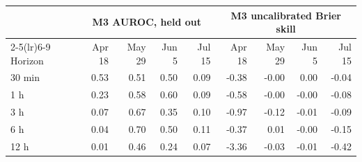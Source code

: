 \begin{tabular}{lrrrrrrrr}\toprule & \multicolumn{4}{c}{M3 AUROC, held out} & \multicolumn{4}{c}{M3 uncalibrated Brier skill}\\\cmidrule(lr){2-5}\cmidrule(lr){6-9} Horizon & Apr 18 & May 29 & Jun 5 & Jul 15 & Apr 18 & May 29 & Jun 5 & Jul 15\\\midrule
30 min & 0.53 & 0.51 & 0.50 & 0.09 & -0.38 & -0.00 & 0.00 & -0.04\\
1 h & 0.23 & 0.58 & 0.60 & 0.09 & -0.58 & -0.00 & -0.00 & -0.08\\
3 h & 0.07 & 0.67 & 0.35 & 0.10 & -0.97 & -0.12 & -0.01 & -0.09\\
6 h & 0.04 & 0.70 & 0.50 & 0.11 & -0.37 & 0.01 & -0.00 & -0.15\\
12 h & 0.01 & 0.46 & 0.24 & 0.07 & -3.36 & -0.03 & -0.01 & -0.42\\
\bottomrule\end{tabular}
